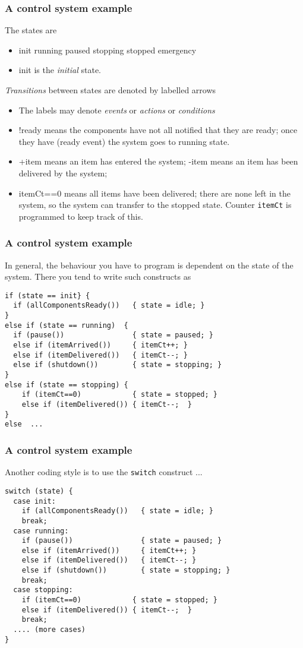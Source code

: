\documentclass[10pt, hyperref={pdfpagelabels=false}]{beamer}
\begin{document}
\begin{frame}
\frametitle{A control system example}
The states are
\begin{itemize}
\item {\color{brown} \large init running paused stopping stopped emergency}
\item {\color{brown} init} is the \emph{initial} state.
\end{itemize}

\emph{Transitions} between states are denoted by labelled arrows
\begin{itemize}
\item The labels may denote \emph{events} or \emph{actions} or \emph{conditions}
\item {\color{blue}!ready} means the components have not all notified that they are ready; once they have ({\color{blue}ready} event) the system goes to {\color{brown}running} state.
\item {\color{blue}+item} means an item has entered the system; {\color{blue}-item} means an item has been delivered by the system;
\item {\color{blue}itemCt==0} means all items have been delivered; there are none left in the system, so the system can transfer to the  {\color{brown}stopped} state. Counter \texttt{itemCt} is  programmed to keep track of this.
\end{itemize}
\end{frame}

\begin{frame} [fragile]
\frametitle{A control system example}
In general, the behaviour you have to program is dependent on the state of the system. There you tend to write such constructs as
{\color{blue}
\begin{verbatim}
if (state == init} {
  if (allComponentsReady())   { state = idle; }
}
else if (state == running)  {
  if (pause())                { state = paused; }
  else if (itemArrived())     { itemCt++; }
  else if (itemDelivered())   { itemCt--; }
  else if (shutdown())        { state = stopping; }
}
else if (state == stopping) {
    if (itemCt==0)            { state = stopped; }
    else if (itemDelivered()) { itemCt--;  }
}
else  ...
\end{verbatim}
}
\end{frame}

\begin{frame} [fragile]
\frametitle{A control system example}
Another coding style is to use the \texttt{switch} construct ...
{\color{blue}
\begin{verbatim}
switch (state) {
  case init:
    if (allComponentsReady())   { state = idle; }
    break;
  case running:
    if (pause())                { state = paused; }
    else if (itemArrived())     { itemCt++; }
    else if (itemDelivered())   { itemCt--; }
    else if (shutdown())        { state = stopping; }
    break;
  case stopping:
    if (itemCt==0)            { state = stopped; }
    else if (itemDelivered()) { itemCt--;  }
    break;
  .... (more cases)
} 
\end{verbatim}
}
\end{frame}
\end{document}
